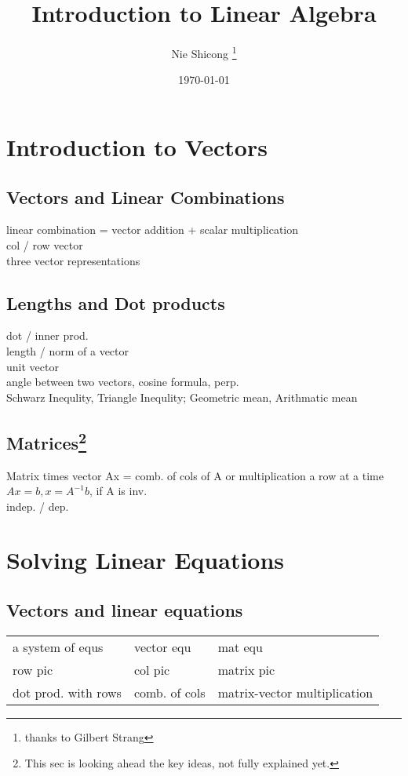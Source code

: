 \documentclass{report}
\title{Introduction to Linear Algebra}
\author{Nie Shicong \thanks{thanks to Gilbert Strang}}
\date{\today}
\begin{document}
\begin{titlepage}
    \maketitle
\end{titlepage}

\tableofcontents

\chapter{Introduction to Vectors}
\section{Vectors and Linear Combinations}
linear combination = vector addition + scalar multiplication \\
col / row vector  \\
three vector representations  \\

\section{Lengths and Dot products}
dot / inner prod.  \\
length / norm of a vector  \\
unit vector  \\
angle between two vectors, cosine formula, perp.  \\
Schwarz Inequlity, Triangle Inequlity; Geometric mean, Arithmatic mean \\

\section[Matrices]{Matrices\footnote{This sec is looking ahead the key ideas, not fully explained yet.}}
Matrix times vector Ax = comb. of cols of A or multiplication a row at a time  \\
$Ax = b, x = A^{-1}b$, if A is inv.  \\
indep. / dep.  \\

\chapter{Solving Linear Equations}
\section{Vectors and linear equations}
\begin{tabular}{ l | l | l }
    a system of equs    & vector equ    & mat equ \\
    row pic             & col pic       & matrix pic \\
    dot prod. with rows & comb. of cols & matrix-vector multiplication
\end{tabular}
\end{document}

